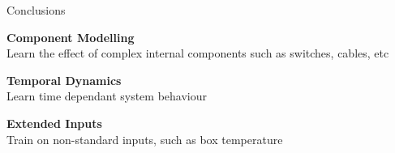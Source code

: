 \documentclass[aspectratio=169]{beamer}
\begin{document}



\begin{frame}{\small{Conclusions}}
	\vspace{0.5cm}
	\begin{center}
		\begin{tcolorbox}[colback=blue!5!white,colframe=blue!75!black,width=0.9\textwidth]
			\textbf{Component Modelling} \\
			Learn the effect of complex internal components such as switches, cables, etc
		\end{tcolorbox}

		\vspace{0.3cm}

		\begin{tcolorbox}[colback=green!5!white,colframe=green!75!black,width=0.9\textwidth]
			\textbf{Temporal Dynamics} \\
			Learn time dependant system behaviour
		\end{tcolorbox}

		\vspace{0.3cm}

		\begin{tcolorbox}[colback=orange!5!white,colframe=orange!75!black,width=0.9\textwidth]
			\textbf{Extended Inputs} \\
			Train on non-standard inputs, such as box temperature
		\end{tcolorbox}
	\end{center}
\end{frame}
\end{document}

